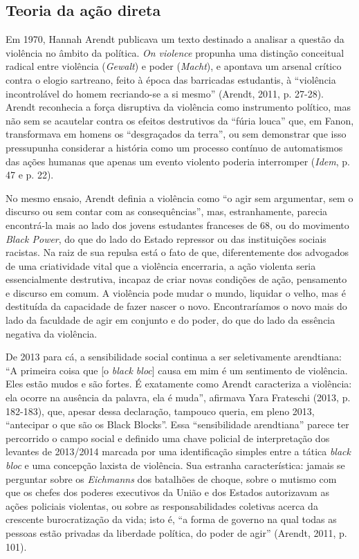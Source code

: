 \subsection{Teoria da ação direta}

Em 1970, Hannah Arendt publicava um
texto destinado a analisar a questão da violência no âmbito da política.
\emph{On violence} propunha uma distinção conceitual radical entre
violência (\emph{Gewalt}) e poder (\emph{Macht}), e apontava um arsenal
crítico contra o elogio sartreano, feito à época das barricadas
estudantis, à ``violência incontrolável do homem recriando-se a si
mesmo'' (Arendt, 2011, p. 27-28). Arendt reconhecia a força disruptiva
da violência como instrumento político, mas não sem se acautelar contra
os efeitos destrutivos da ``fúria louca'' que, em Fanon, transformava em
homens os ``desgraçados da terra'', ou sem demonstrar que isso
pressupunha considerar a história como um processo contínuo de
automatismos das ações humanas que apenas um evento violento poderia
interromper (\emph{Idem}, p. 47 e p. 22).

No mesmo ensaio, Arendt definia a violência como ``o agir sem
argumentar, sem o discurso ou sem contar com as consequências'', mas,
estranhamente, parecia encontrá-la mais ao lado dos jovens estudantes
franceses de 68, ou do movimento \emph{Black Power}, do que do lado do
Estado repressor ou das instituições sociais racistas. Na raiz de sua
repulsa está o fato de que, diferentemente dos advogados de uma
criatividade vital que a violência encerraria, a ação violenta seria
essencialmente destrutiva, incapaz de criar novas condições de ação,
pensamento e discurso em comum. A violência pode mudar o mundo, liquidar
o velho, mas é destituída da capacidade de fazer nascer o novo.
Encontraríamos o novo mais do lado da faculdade de agir em conjunto e do
poder, do que do lado da essência negativa da violência.

De 2013 para cá, a sensibilidade social continua a ser seletivamente
arendtiana: ``A primeira coisa que {[}o \emph{black bloc}{]} causa em
mim é um sentimento de violência. Eles estão mudos e são fortes. É
exatamente como Arendt caracteriza a violência: ela ocorre na ausência
da palavra, ela é muda'', afirmava Yara Frateschi (2013, p. 182-183),
que, apesar dessa declaração, tampouco queria, em pleno 2013,
``antecipar o que são os Black Blocks''. Essa ``sensibilidade
arendtiana'' parece ter percorrido o campo social e definido uma chave
policial de interpretação dos levantes de 2013/2014 marcada por uma
identificação simples entre a tática \emph{black bloc} e uma concepção
laxista de violência. Sua estranha característica: jamais se perguntar
sobre os \emph{Eichmanns }dos batalhões de choque, sobre o mutismo com
que os chefes dos poderes executivos da União e dos Estados autorizavam
as ações policiais violentas, ou sobre as responsabilidades coletivas
acerca da crescente burocratização da vida; isto é, ``a forma de governo
na qual todas as pessoas estão privadas da liberdade política, do poder
de agir'' (Arendt, 2011, p. 101).

